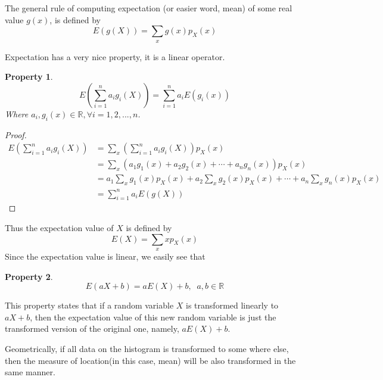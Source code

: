\documentclass{article}
\newtheorem{property}{Property}
\begin{document}
The general rule of computing expectation (or easier word, mean) of some real value $g(x)$, is defined by
\[ E(g(X)) = \sum_x g(x)p_X(x) \] 

Expectation has a very nice property, it is a linear operator.
\begin{property}
	\[ E\left( \sum_{i=1}^n a_ig_i(X) \right) = \sum_{i=1}^n a_i E(g_i(x))\]
	Where $a_i,g_i(x)\in\mathbb{R}, \forall i=1,2,...,n$.
\end{property}
\begin{proof}
	\begin{align*}
	E\left( \sum_{i=1}^n a_ig_i(X) \right) &= \sum_x \left( \sum_{i=1}^n a_ig_i(X) \right)p_X(x)\\
	&= \sum_x (a_1g_1(x)+a_2g_2(x)+\cdots+a_ng_n(x) )p_X(x)\\
	&= a_1\sum_xg_1(x)p_X(x) + a_2\sum_xg_2(x)p_X(x) + \cdots + a_n\sum_xg_n(x)p_X(x)\\
	&= \sum_{i=1}^n a_iE(g(X))
	\end{align*}
\end{proof}


Thus the expectation value of $X$ is defined by 
\[ E(X) = \sum_x xp_X(x) \]
Since the expectation value is linear, we easily see that
\begin{property}
	\[ E(aX+b) = aE(X)+b,\;\;a,b\in\mathbb{R} \]
\end{property}
This property states that if a random variable $X$ is transformed linearly to $aX+b$, then the expectation value of this new random variable is just the transformed version of the original one, namely, $aE(X)+b$.

Geometrically, if all data on the histogram is transformed to some where else, then the measure of location(in this case, mean) will be also transformed in the same manner. \\
\end{document}
